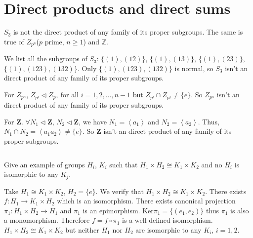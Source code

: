 \section{Direct products and direct sums}
\begin{ex}
    $S_{3}$ is not the direct product of any family of its proper subgroups. The same is true of $Z_{p^{n}}$($p$ prime, $n\geq 1$) and $\mathbb{Z}$.
\end{ex}

\begin{answer}
    We list all the subgroups of $S_{3}$: $\{(1), (12)\}$, $\{(1), (13)\}$, $\{(1), (23)\}$, $\{(1), (123), (132)\}$. Only $\{(1), (123), (132)\}$ is normal, so $S_{3}$ isn't an direct product of any family of its proper subgroups.

    For $Z_{p^{n}}$, $Z_{p^{i}}\lhd Z_{p^{n}}$ for all $i=1,2,\dots ,n-1$ but $Z_{p^{i}}\cap Z_{p^{j}}\neq \{e\}$. So $Z_{p^{n}}$ isn't an direct product of any family of its proper subgroups.

    For $\mathbf{Z}$. $\forall N_{1}\lhd \mathbf{Z}$, $N_{2}\lhd \mathbf{Z}$, we have $N_{1}=\left\langle a_{1}\right\rangle$ and $N_{2}=\left\langle a_{2}\right\rangle$. Thus, $N_{1}\cap N_{2}=\left\langle a_{1}a_{2}\right\rangle\neq \{e\}$. So $\mathbf{Z}$ isn't an direct product of any family of its proper subgroups.
\end{answer}

$$ $$

\begin{ex}
    Give an example of groups $H_{i}$, $K_{i}$ such that $H_{1}\times H_{2}\cong K_{1}\times K_{2}$ and no $H_{i}$ is isomorphic to any $K_{j}$.
\end{ex}

\begin{answer}
    Take $H_{1}\cong K_{1}\times K_{2}$, $H_{2}=\{e\}$. We verify that $H_{1}\times H_{2}\cong K_{1}\times K_{2}$. There exists $f:H_{1}\to K_{1}\times H_{2}$ which is an isomorphism. There exists canonical projection $\pi_{1}:H_{1}\times H_{2}\to H_{1}$ and $\pi_{1}$ is an epimorphism. $\mathrm{Ker}\pi_{1}=\{(e_{1},e_{2})\}$ thus $\pi_{1}$ is also a monomorphism. Therefore $\bar{f}=f\circ \pi_{1}$ is a well defined isomorphism. $H_{1}\times H_{2}\cong K_{1}\times K_{2}$ but neither $H_{1}$ nor $H_{2}$ are isomorphic to any $K_{i}$, $i=1,2$.
\end{answer}

$$ $$

